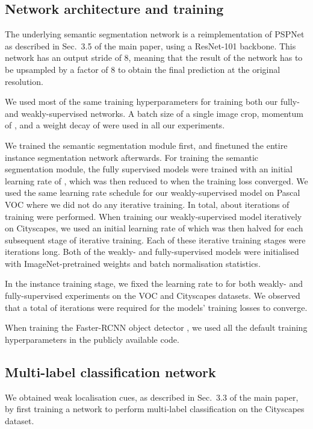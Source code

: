 \documentclass[runningheads]{llncs}
\begin{document}
\subsection{Network architecture and training}
The underlying semantic segmentation network is a reimplementation of PSPNet \cite{zhao_cvpr_2017} as described in Sec.~3.5 of the main paper, using a ResNet-101 backbone.
This network has an output stride of 8, meaning that the result of the network has to be upsampled by a factor of 8 to obtain the final prediction at the original resolution.

We used most of the same training hyperparameters for training both our fully- and weakly-supervised networks.
A batch size of a single  image crop, momentum of , and a weight decay of  were used in all our experiments.

We trained the semantic segmentation module first, and finetuned the entire instance segmentation network afterwards.
For training the semantic segmentation module, the fully supervised models were trained with an initial learning rate of , which was then reduced to  when the training loss converged.
We used the same learning rate schedule for our weakly-supervised model on Pascal VOC where we did not do any iterative training.
In total, about  iterations of training were performed.
When training our weakly-supervised model iteratively on Cityscapes, we used an initial learning rate of  which was then halved for each subsequent stage of iterative training.
Each of these iterative training stages were  iterations long.
Both of the weakly- and fully-supervised models were initialised with ImageNet-pretrained weights and batch normalisation statistics.

In the instance training stage, we fixed the learning rate to  for both weakly- and fully-supervised experiments on the VOC and Cityscapes datasets. 
We observed that a total of  iterations were required for the models' training losses to converge.

When training the Faster-RCNN object detector \cite{ren_2015}, we used all the default training hyperparameters in the publicly available code.

\subsection{Multi-label classification network}
\label{sec:multilabel_training}

We obtained weak localisation cues, as described in Sec.~3.3 of the main paper, by first training a network to perform multi-label classification on the Cityscapes dataset.
\end{document}
